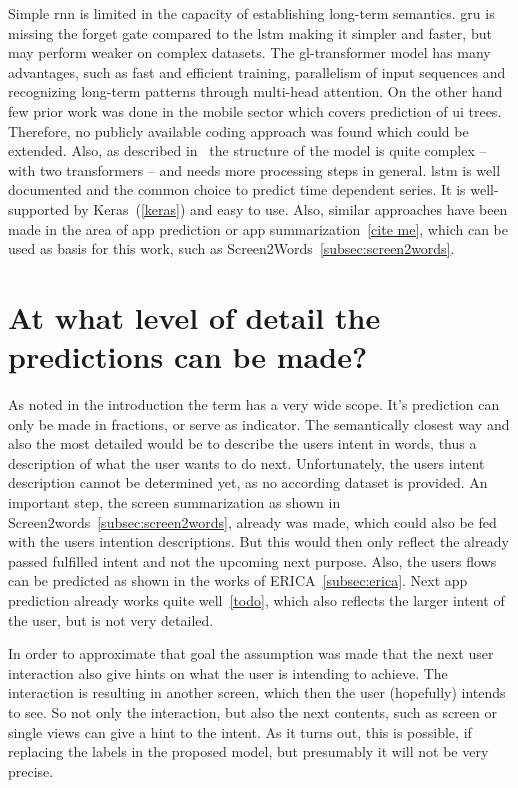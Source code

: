Simple \gls{rnn} is limited in the capacity of establishing long-term semantics.
\gls{gru} is missing the forget gate compared to the \gls{lstm} making it simpler and faster, but may perform weaker on complex datasets.
The \gls{gl-transformer} model has many advantages, such as fast and efficient training, parallelism of input sequences and recognizing long-term patterns through multi-head attention.
On the other hand few prior work was done in the mobile sector which covers prediction of \gls{ui} trees.
Therefore, no publicly available coding approach was found which could be extended.
Also, as described in~\cite{zhou2021large} the structure of the model is quite complex -- with two transformers -- and needs more processing steps in general.
\gls{lstm} is well documented and the common choice to predict time dependent series.
It is well-supported by Keras~(\ref{keras}) and easy to use.
Also, similar approaches have been made in the area of app prediction or app summarization~\ref{cite me}, which can be used as basis for this work, such as Screen2Words~\ref{subsec:screen2words}.


\section{At what level of detail the predictions can be made?}

As noted in the introduction the term  has a very wide scope.
It's prediction can only be made in fractions, or serve as indicator.
The semantically closest way and also the most detailed would be to describe the users intent in words, thus a description of what the user wants to do next.
Unfortunately, the users intent description cannot be determined yet, as no according dataset is provided.
An important step, the screen summarization as shown in Screen2words~\ref{subsec:screen2words}, already was made, which could also be fed with the users intention descriptions.
But this would then only reflect the already passed fulfilled intent and not the upcoming next purpose.
Also, the users flows can be predicted as shown in the works of ERICA~\ref{subsec:erica}.
Next app prediction already works quite well~\ref{todo}, which also reflects the larger intent of the user, but is not very detailed.

In order to approximate that goal the assumption was made that the next user interaction also give hints on what the user is intending to achieve.
The interaction is resulting in another screen, which then the user (hopefully) intends to see.
So not only the interaction, but also the next contents, such as screen or single views can give a hint to the intent.
As it turns out, this is possible, if replacing the labels in the proposed model, but presumably it will not be very precise.

